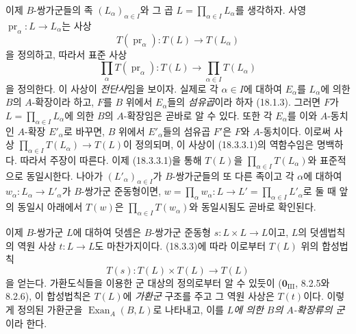 \begin{env}[18.3.3]
\label{0.18.3.3-fr}
이제 $B$-쌍가군들의 족 $(L_\alpha)_{\alpha\in I}$와 그 곱
$L=\prod_{\alpha\in I}L_\alpha$를 생각하자. 사영
$\operatorname{pr}_\alpha:L\to L_\alpha$는 사상
\[
  T(\operatorname{pr}_\alpha):T(L)\to T(L_\alpha)
\]
을 정의하고, 따라서 표준 사상
\begin{equation}
\label{0.18.3.3.1-fr}
\tag{18.3.3.1}
  \prod_\alpha T(\operatorname{pr}_\alpha):T(L)
  \longrightarrow\prod_{\alpha\in I}T(L_\alpha)
\end{equation}
을 정의한다. 이 사상이 \emph{전단사}임을 보이자. 실제로 각
$\alpha\in I$에 대하여 $E_\alpha$를 $L_\alpha$에 의한 $B$의
$A$-확장이라 하고, $F$를 $B$ 위에서 $E_\alpha$들의
\emph{섬유곱}이라 하자 (18.1.3). 그러면 $F$가
$L=\prod_{\alpha\in I}L_\alpha$에 의한 $B$의 $A$-확장임은
곧바로 알 수 있다. 또한 각 $E_\alpha$를 이와 $A$-동치인
$A$-확장 $E'_\alpha$로 바꾸면, $B$ 위에서 $E'_\alpha$들의
섬유곱 $F'$은 $F$와 $A$-동치이다. 이로써 사상
$\prod_{\alpha\in I}T(L_\alpha)\to T(L)$이 정의되며, 이 사상이
(18.3.3.1)의 역함수임은 명백하다. 따라서 주장이 따른다. 이제
(18.3.3.1)을 통해 $T(L)$을 $\prod_{\alpha\in I}T(L_\alpha)$와
표준적으로 동일시한다. 나아가 $(L'_\alpha)_{\alpha\in I}$가
$B$-쌍가군들의 또 다른 족이고 각 $\alpha$에 대하여
$w_\alpha:L_\alpha\to L'_\alpha$가 $B$-쌍가군 준동형이면,
$w=\prod_\alpha w_\alpha:L\to
L'=\prod_{\alpha\in I}L'_\alpha$로 둘 때 앞의 동일시 아래에서 $T(w)$은
$\prod_{\alpha\in I}T(w_\alpha)$와 동일시됨도 곧바로 확인된다.
\end{env}

\begin{env}[18.3.4]
\label{0.18.3.4-fr}
이제 $B$-쌍가군 $L$에 대하여 덧셈은 $B$-쌍가군 준동형
$s:L\times L\to L$이고, $L$의 덧셈법칙의 역원 사상 $t:L\to L$도
마찬가지이다. (18.3.3)에 따라 이로부터 $T(L)$ 위의 합성법칙
\[
  T(s):T(L)\times T(L)\longrightarrow T(L)
\]
을 얻는다. 가환도식들을 이용한 군 대상의 정의로부터 알 수 있듯이
($\mathbf 0_{\mathrm{III}}$, 8.2.5와 8.2.6), 이 합성법칙은
$T(L)$에 \emph{가환군} 구조를 주고 그 역원 사상은 $T(t)$이다.
이렇게 정의된
가환군을 $\operatorname{Exan}_A(B,L)$로 나타내고, 이를
\emph{$L$에 의한 $B$의 $A$-확장류의 군}이라 한다.
\end{env}

